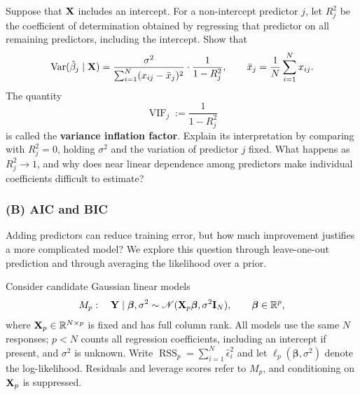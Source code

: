 \begin{enumerate}[label=\textcolor{AccentInk}{\sffamily\bfseries A\arabic*.},
                  ref=A\arabic*,leftmargin=2.65em,labelsep=0.65em,itemsep=1em]
Suppose that $\mathbf{X}$ includes an intercept. For a non-intercept predictor $j$, let
$R_j^2$ be the coefficient of determination obtained by regressing that predictor
on all remaining predictors, including the intercept. Show that
\[
    \operatorname{Var}(\hat\beta_j\mid\mathbf{X})
    =\frac{\sigma^2}{\sum_{i=1}^N(x_{ij}-\bar x_j)^2}
     \cdot\frac{1}{1-R_j^2},
    \qquad
    \bar x_j=\frac1N\sum_{i=1}^N x_{ij}.
\]
The quantity
\[
    \operatorname{VIF}_j:=\frac{1}{1-R_j^2}
\]
is called the \textbf{variance inflation factor}. Explain its interpretation by
comparing with $R_j^2=0$, holding $\sigma^2$ and the variation of predictor $j$
fixed. What happens as $R_j^2\to1$, and why does near linear dependence among
predictors make individual coefficients difficult to estimate?
\end{enumerate}

\subsubsection*{(B) AIC and BIC}
{}
\label{ex:aic-bic}

Adding predictors can reduce training error, but how much improvement justifies
a more complicated model? We explore this question through leave-one-out
prediction and through averaging the likelihood over a prior.

Consider candidate Gaussian linear models
\[
    M_p:\quad \mathbf{Y}\mid\boldsymbol\beta,\sigma^2
    \sim\mathcal N(\mathbf{X}_p\boldsymbol\beta,\sigma^2\mathbf{I}_N),
    \qquad \boldsymbol\beta\in\mathbb R^p,
\]
where $\mathbf{X}_p\in\mathbb R^{N\times p}$ is fixed and has full column rank.
All models use the same $N$ responses; $p<N$ counts all regression coefficients,
including an intercept if present, and $\sigma^2$ is unknown. Write
$\operatorname{RSS}_p=\sum_{i=1}^N\hat\epsilon_i^2$ and let
$\ell_p(\boldsymbol\beta,\sigma^2)$ denote the log-likelihood. Residuals and
leverage scores refer to $M_p$, and conditioning on $\mathbf{X}_p$ is suppressed.

